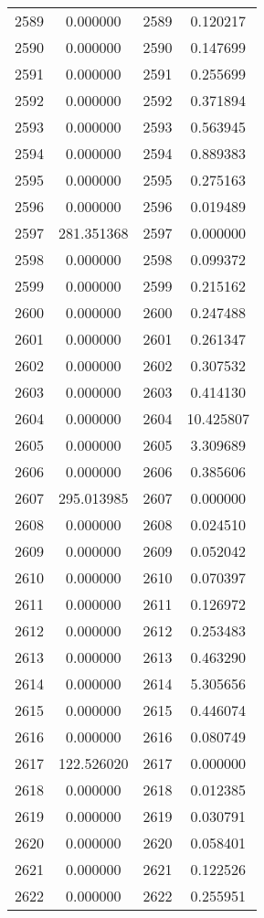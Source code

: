 \documentclass[12pt]{article}
\begin{document}
\begin{longtable}{@{}cccc@{}}
2589 & 0.000000 & 2589 & 0.120217 \\
2590 & 0.000000 & 2590 & 0.147699 \\
2591 & 0.000000 & 2591 & 0.255699 \\
2592 & 0.000000 & 2592 & 0.371894 \\
2593 & 0.000000 & 2593 & 0.563945 \\
2594 & 0.000000 & 2594 & 0.889383 \\
2595 & 0.000000 & 2595 & 0.275163 \\
2596 & 0.000000 & 2596 & 0.019489 \\
2597 & 281.351368 & 2597 & 0.000000 \\
2598 & 0.000000 & 2598 & 0.099372 \\
2599 & 0.000000 & 2599 & 0.215162 \\
2600 & 0.000000 & 2600 & 0.247488 \\
2601 & 0.000000 & 2601 & 0.261347 \\
2602 & 0.000000 & 2602 & 0.307532 \\
2603 & 0.000000 & 2603 & 0.414130 \\
2604 & 0.000000 & 2604 & 10.425807 \\
2605 & 0.000000 & 2605 & 3.309689 \\
2606 & 0.000000 & 2606 & 0.385606 \\
2607 & 295.013985 & 2607 & 0.000000 \\
2608 & 0.000000 & 2608 & 0.024510 \\
2609 & 0.000000 & 2609 & 0.052042 \\
2610 & 0.000000 & 2610 & 0.070397 \\
2611 & 0.000000 & 2611 & 0.126972 \\
2612 & 0.000000 & 2612 & 0.253483 \\
2613 & 0.000000 & 2613 & 0.463290 \\
2614 & 0.000000 & 2614 & 5.305656 \\
2615 & 0.000000 & 2615 & 0.446074 \\
2616 & 0.000000 & 2616 & 0.080749 \\
2617 & 122.526020 & 2617 & 0.000000 \\
2618 & 0.000000 & 2618 & 0.012385 \\
2619 & 0.000000 & 2619 & 0.030791 \\
2620 & 0.000000 & 2620 & 0.058401 \\
2621 & 0.000000 & 2621 & 0.122526 \\
2622 & 0.000000 & 2622 & 0.255951 \\

\end{longtable}
\end{document}
